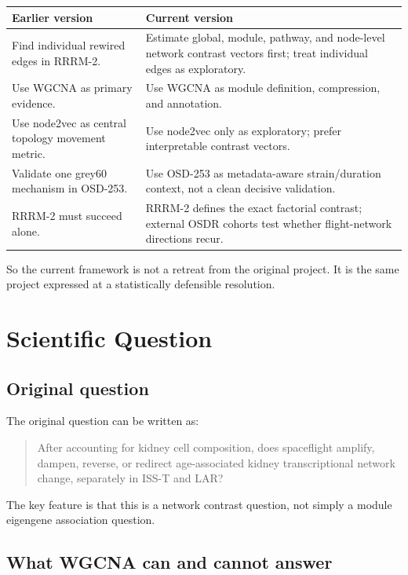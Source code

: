 \documentclass[11pt]{article}
\begin{document}
\begin{center}
\begin{tabularx}{0.92\textwidth}{p{}X}
\toprule
Earlier version & Current version \\
\midrule
Find individual rewired edges in RRRM-2. &
Estimate global, module, pathway, and node-level network contrast vectors first;
treat individual edges as exploratory. \\
\addlinespace
Use WGCNA as primary evidence. &
Use WGCNA as module definition, compression, and annotation. \\
\addlinespace
Use node2vec as central topology movement metric. &
Use node2vec only as exploratory; prefer interpretable contrast vectors. \\
\addlinespace
Validate one grey60 mechanism in OSD-253. &
Use OSD-253 as metadata-aware strain/duration context, not a clean decisive
validation. \\
\addlinespace
RRRM-2 must succeed alone. &
RRRM-2 defines the exact factorial contrast; external OSDR cohorts test whether
flight-network directions recur. \\
\bottomrule
\end{tabularx}
\end{center}

So the current framework is not a retreat from the original project. It is the
same project expressed at a statistically defensible resolution.

\section{Scientific Question}

\subsection{Original question}

The original question can be written as:

\begin{quote}
After accounting for kidney cell composition, does spaceflight amplify, dampen,
reverse, or redirect age-associated kidney transcriptional network change,
separately in ISS-T and LAR?
\end{quote}

The key feature is that this is a network contrast question, not simply a module
eigengene association question.

\subsection{What WGCNA can and cannot answer}
\end{document}
